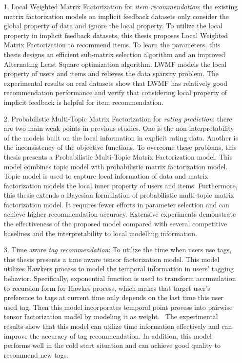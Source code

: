 \begin{itemize}
\item[1.] Local Weighted Matrix Factorization for \textit{item recommendation}:  the existing matrix factorization models on implicit feedback datasets only consider the global property of data and ignore the local property.  To utilize the local property in implicit feedback datasets, this thesis proposes Local Weighted Matrix Factorization to recommend items.  To learn the parameters, this thesis designs an efficient sub-matrix selection algorithm and an improved Alternating Least Square optimization algorithm.  LWMF models the local property of users and items and relieves the data sparsity problem.  The experimental results on real datasets show that LWMF has relatively good recommendation performance and verify that considering local property of implicit feedback is helpful for item recommendation. 
	
\item[2.] Probabilistic Multi-Topic Matrix Factorization for \textit{rating prediction}:   there are two main weak points in previous studies. One is the non-interpretability of the models built on the local information in explicit rating data. Another is the inconsistency of the objective functions. To overcome these problems, this thesis presents a Probabilistic Multi-Topic Matrix Factorization model. This model combines topic model with probabilistic matrix factorization model. Topic model is used to capture local information of data and matrix factorization models the local inner property of users and items. Furthermore, this thesis extends a Bayesian formulation of probabilistic multi-topic matrix factorization model.  It requires fewer efforts in parameter selection and can achieve higher recommendation accuracy. Extensive experiments demonstrate the effectiveness of the proposed model compared with several competitive baselines and the interpretability to local modelling information.  

\item[3.] Time aware \textit{tag recommendation}:  To utilize the time when users use tags, this thesis presents a time aware tensor factorization model. This model utilizes Hawkers process to model the temporal information in users' tagging behavior. Specifically, exponential function is used to transform accumulation to recursion form for Hawkes process, which makes that target user's preference to tags at current time only depends on the last time this user used tag. Then this model incorporates temporal point process into pairwise tensor factorization model by modeling it as weight.  The experimental results show that this model can utilize time information effectively and can improve the accuracy of tag recommendation. In addition, this model performs well in the cold start situation and can achieve good quality to recommend new tags.
\end{itemize}


